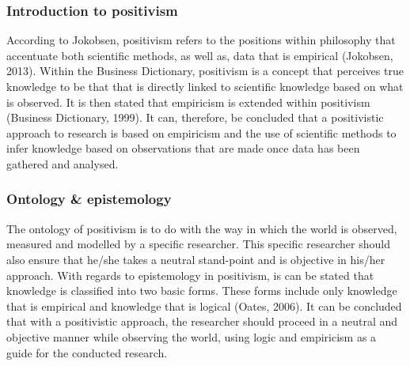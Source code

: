 \subsubsection{Introduction to positivism}
According to Jokobsen, positivism refers to the positions within philosophy that accentuate both scientific methods, as well as, data that is empirical (Jokobsen, 2013). Within the Business Dictionary, positivism is a concept that perceives true knowledge to be that that is directly linked to scientific knowledge based on what is observed. It is then stated that empiricism is extended within positivism (Business Dictionary, 1999).
It can, therefore, be concluded that a positivistic approach to research is based on empiricism and the use of scientific methods to infer knowledge based on observations that are made once data has been gathered and analysed.
\subsubsection{Ontology \& epistemology}
The ontology of positivism is to do with the way in which the world is observed, measured and modelled by a specific researcher. This specific researcher should also ensure that he/she takes a neutral stand-point and is objective in his/her approach. 
With regards to epistemology in positivism, is can be stated that knowledge is classified into two basic forms. These forms include only knowledge that is empirical and knowledge that is logical (Oates, 2006).
It can be concluded that with a positivistic approach, the researcher should proceed in a neutral and objective manner while observing the world, using logic and empiricism as a guide for the conducted research.
